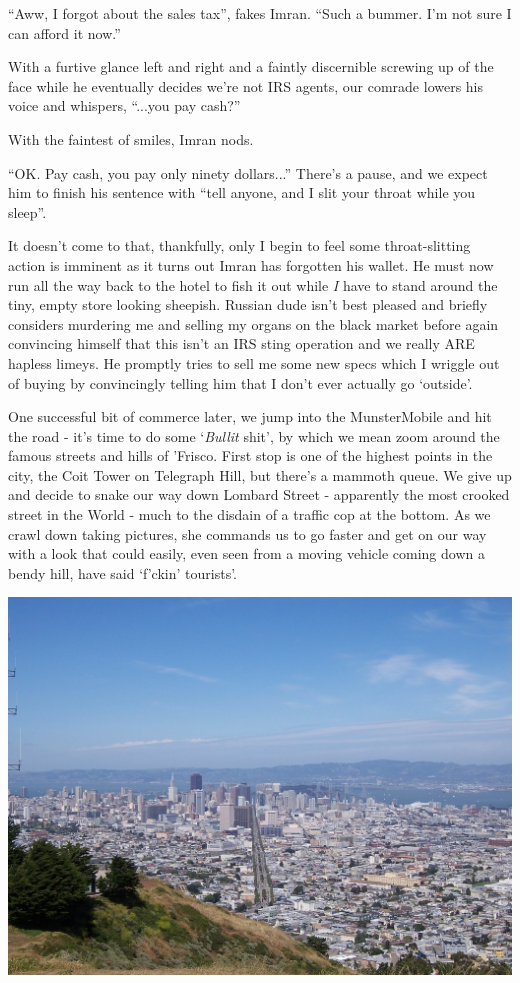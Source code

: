 \documentclass[a5paper,titlepage,11pt]{book}
\begin{document}
``Aww, I forgot about the sales tax'', fakes Imran. ``Such a bummer. I'm not sure I can afford it now.''

With a furtive glance left and right and a faintly discernible screwing up of the face while he eventually decides we're not IRS agents, our comrade lowers his voice and whispers, ``...you pay cash?''

With the faintest of smiles, Imran nods.

``OK. Pay cash, you pay only ninety dollars...'' There's a pause, and we expect him to finish his sentence with ``tell anyone, and I slit your throat while you sleep''.

It doesn't come to that, thankfully, only I begin to feel some throat-slitting action is imminent as it turns out Imran has forgotten his wallet. He must now run all the way back to the hotel to fish it out while \emph{I} have to stand around the tiny, empty store looking sheepish. Russian dude isn't best pleased and briefly considers murdering me and selling my organs on the black market before again convincing himself that this isn't an IRS sting operation and we really ARE hapless limeys. He promptly tries to sell me some new specs which I wriggle out of buying by convincingly telling him that I don't ever actually go `outside'.

One successful bit of commerce later, we jump into the MunsterMobile and hit the road - it's time to do some `\emph{Bullit} shit', by which we mean zoom around the famous streets and hills of 'Frisco. First stop is one of the highest points in the city, the Coit Tower on Telegraph Hill, but there's a mammoth queue. We give up and decide to snake our way down Lombard Street - apparently the most crooked street in the World - much to the disdain of a traffic cop at the bottom. As we crawl down taking pictures, she commands us to go faster and get on our way with a look that could easily, even seen from a moving vehicle coming down a bendy hill, have said `f'ckin' tourists'.

\begin{center}\includegraphics[width=\textwidth]{gfx/100_1168}\end{center}
\end{document}
